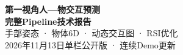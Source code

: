 \documentclass[10pt,a4paper,UTF8,fontset=fandol]{ctexart}
\begin{document}
\begin{center}
{\LARGE\bfseries 第一视角人—物交互预测}\\[7pt]
{\Large\bfseries 完整Pipeline技术报告}\\[8pt]
{\normalsize 手部姿态 · 物体6D · 动态交互图 · RSI优化}\\[5pt]
{\small 2026年11月13日\quad 单栏公开版 · 连续Demo更新}
\end{center}
\end{document}
